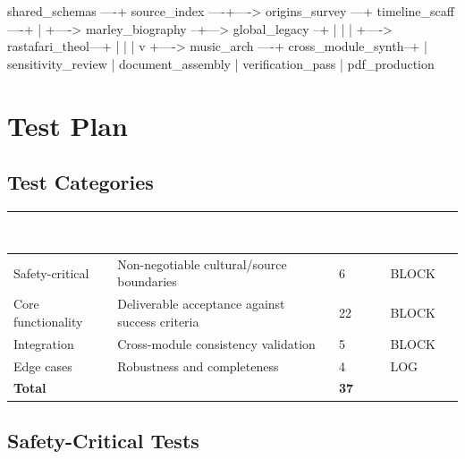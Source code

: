 \documentclass[11pt,letterpaper]{article}
\newcommand{\tableheader}[1]{\textbf{\sffamily\textcolor{white}{#1}}}
\begin{document}
\begin{asciibox}
shared_schemas ----+
source_index  ----+----> origins_survey ---+
timeline_scaff----+                        |
                  +----> marley_biography --+---> global_legacy --+
                  |                        |                      |
                  +----> rastafari_theol---+                      |
                  |                        |                      v
                  +----> music_arch    ----+  cross_module_synth--+
                                                      |
                                              sensitivity_review
                                                      |
                                              document_assembly
                                                      |
                                             verification_pass
                                                      |
                                              pdf_production
\end{asciibox}

\section{Test Plan}

\subsection{Test Categories}

\begin{center}
\begin{tabularx}{\textwidth}{L{3cm}XC{2cm}C{2cm}}
\toprule
{}
\tableheader{Category} & \tableheader{Purpose} & \tableheader{Count} & \tableheader{On Failure} \\
\midrule
Safety-critical & Non-negotiable cultural/source boundaries & 6 & BLOCK \\
Core functionality & Deliverable acceptance against success criteria & 22 & BLOCK \\
Integration & Cross-module consistency validation & 5 & BLOCK \\
Edge cases & Robustness and completeness & 4 & LOG \\
\midrule
\textbf{Total} & & \textbf{37} & \\
\bottomrule
\end{tabularx}
\end{center}

\subsection{Safety-Critical Tests}
\end{document}
